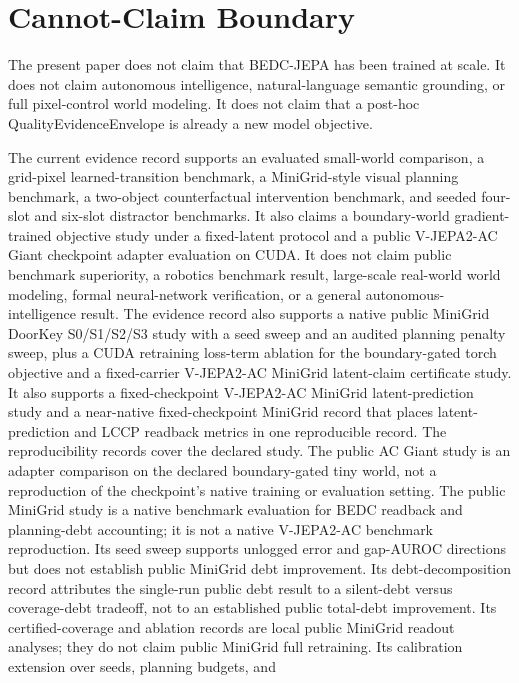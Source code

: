 \section{Cannot-Claim Boundary}
\label{sec:cannot-claim-boundary}

The present paper does not claim that BEDC-JEPA has been trained at scale.  It
does not claim autonomous intelligence, natural-language semantic grounding,
or full pixel-control world modeling.  It does not claim that a post-hoc
QualityEvidenceEnvelope is already a new model objective.

The current evidence record supports an evaluated small-world comparison, a grid-pixel
learned-transition benchmark, a MiniGrid-style visual planning benchmark, a
two-object counterfactual intervention benchmark, and seeded four-slot and
six-slot distractor benchmarks.  It also claims a boundary-world
gradient-trained objective study under a fixed-latent protocol and a
public V-JEPA2-AC Giant checkpoint adapter evaluation on CUDA.  It does not
claim public benchmark superiority, a robotics benchmark result, large-scale
real-world world modeling, formal neural-network verification, or a general
autonomous-intelligence result.  The evidence record also supports a native public
MiniGrid DoorKey S0/S1/S2/S3 study with a seed sweep and an audited planning
penalty sweep, plus a CUDA retraining loss-term ablation for the boundary-gated
torch objective and a fixed-carrier V-JEPA2-AC MiniGrid latent-claim
certificate study.  It also supports a fixed-checkpoint V-JEPA2-AC MiniGrid
latent-prediction study and a near-native fixed-checkpoint MiniGrid record
that places latent-prediction and LCCP readback metrics in one reproducible
record.  The
reproducibility records cover the declared study.
The public AC Giant study is an adapter comparison on the declared
boundary-gated tiny world, not a reproduction of the checkpoint's native
training or evaluation setting.  The public MiniGrid study is a native
benchmark evaluation for BEDC readback and planning-debt accounting; it is not a
native V-JEPA2-AC benchmark reproduction.  Its seed sweep supports unlogged
error and gap-AUROC directions but does not establish public MiniGrid debt
improvement.  Its debt-decomposition record attributes the single-run public
debt result to a silent-debt versus coverage-debt tradeoff, not to an established
public total-debt improvement.  Its certified-coverage and ablation records
are local public MiniGrid readout analyses; they do not claim public MiniGrid
full retraining.  Its calibration extension over seeds, planning budgets, and
